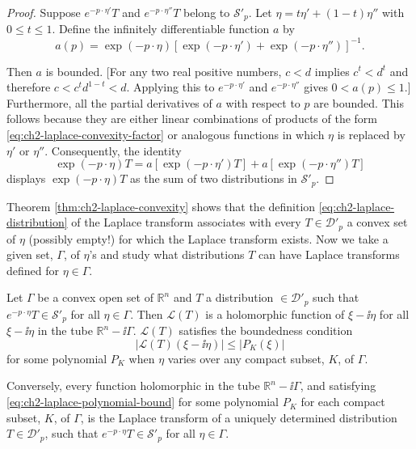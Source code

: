 \begin{proof}
Suppose $e^{-p\cdot\eta'}T$ and $e^{-p\cdot\eta''}T$ belong to
$\mathcal{S}'_p$.  Let $\eta=t\eta'+(1-t)\eta''$ with $0\leq t\leq1$.
Define the infinitely differentiable function $a$ by
\begin{equation}
  a(p)=\exp(-p\cdot\eta)
  [\exp(-p\cdot\eta')+\exp(-p\cdot\eta'')]^{-1}.
  \tag{2-64}\label{eq:ch2-laplace-convexity-factor}
\end{equation}

Then $a$ is bounded.  [For any two real positive numbers, $c<d$ implies
$c^t<d^t$ and therefore $c<c^td^{1-t}<d$.  Applying this to
$e^{-p\cdot\eta'}$ and $e^{-p\cdot\eta''}$ gives $0<a(p)\leq1$.]
Furthermore, all the partial derivatives of $a$ with respect to $p$ are
bounded.  This follows because they are either linear combinations of
products of the form \eqref{eq:ch2-laplace-convexity-factor} or analogous functions in which $\eta$ is
replaced by $\eta'$ or $\eta''$.  Consequently, the identity
\begin{equation*}
  \exp(-p\cdot\eta)T
  =a[\exp(-p\cdot\eta')T]+a[\exp(-p\cdot\eta'')T]
\end{equation*}
displays $\exp(-p\cdot\eta)T$ as the sum of two distributions in
$\mathcal{S}'_p$.
\end{proof}

Theorem \ref{thm:ch2-laplace-convexity} shows that the definition \eqref{eq:ch2-laplace-distribution} of the Laplace transform
associates with every $T\in\mathcal{D}'_p$ a convex set of $\eta$ (possibly
empty!) for which the Laplace transform exists.  Now we take a given set,
$\Gamma$, of $\eta$'s and study what distributions $T$ can have Laplace
transforms defined for $\eta\in\Gamma$.

\begin{theorem}[2-6]\label{thm:ch2-laplace-holomorphy}
Let $\Gamma$ be a convex open set of $\mathbb{R}^n$ and $T$ a distribution
$\in\mathcal{D}'_p$ such that $e^{-p\cdot\eta}T\in\mathcal{S}'_p$ for all
$\eta\in\Gamma$.  Then $\mathcal{L}(T)$ is a
holomorphic function of $\xi-\ii\eta$ for all $\xi-\ii\eta$ in the tube
$\mathbb{R}^n-\ii\Gamma$.  $\mathcal{L}(T)$ satisfies the boundedness condition
\begin{equation}
  |\mathcal{L}(T)(\xi-\ii\eta)|\leq |P_K(\xi)|
  \tag{2-65}\label{eq:ch2-laplace-polynomial-bound}
\end{equation}
for some polynomial $P_K$ when $\eta$ varies over any compact subset, $K$,
of $\Gamma$.

Conversely, every function holomorphic in the tube $\mathbb{R}^n-\ii\Gamma$,
and satisfying \eqref{eq:ch2-laplace-polynomial-bound} for some polynomial $P_K$ for each compact subset,
$K$, of $\Gamma$, is the Laplace transform of a uniquely determined
distribution $T\in\mathcal{D}'_p$, such that $e^{-p\cdot\eta}T\in
\mathcal{S}'_p$ for all $\eta\in\Gamma$.
\end{theorem}

